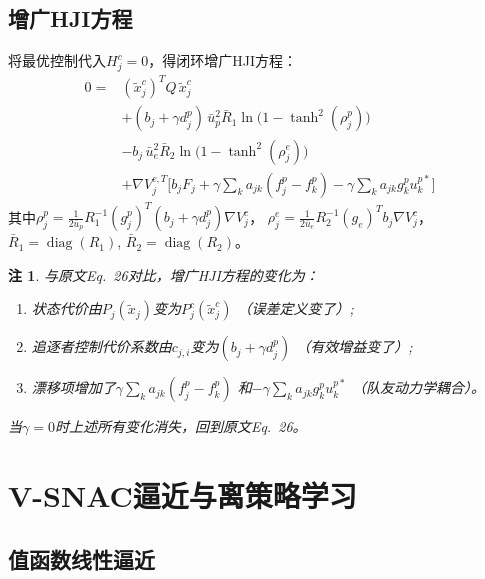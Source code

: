 \documentclass[11pt,a4paper]{article}
\newtheorem{remark}{注}
\DeclareMathOperator{\diag}{diag}
\newcommand{\ub}{\bar{u}}
\begin{document}
\subsection{增广HJI方程}

将最优控制代入$H_j^c = 0$，得闭环增广HJI方程：
\begin{equation}\label{eq:HJI_aug}
  \boxed{
  \begin{aligned}
  0 = {} & (\tilde{x}_j^c)^T Q\, \tilde{x}_j^c \\
  & + (b_j + \gamma d_j^p)\, \ub_p^2 \bar{R}_1
    \ln\!\big(1 - \tanh^2(\rho_j^p)\big) \\
  & - b_j\, \ub_e^2 \bar{R}_2
    \ln\!\big(1 - \tanh^2(\rho_j^e)\big) \\
  & + \nabla V_j^{c,T} \Big[
    b_j F_j + \gamma \textstyle\sum_k a_{jk}(f_j^p - f_k^p)
    - \gamma \textstyle\sum_k a_{jk} g_k^p u_k^{p*}
  \Big]
  \end{aligned}
  }
\end{equation}
其中$\rho_j^p = \frac{1}{2\ub_p} R_1^{-1} (g_j^p)^T (b_j + \gamma d_j^p) \nabla V_j^c$，
$\rho_j^e = \frac{1}{2\ub_e} R_2^{-1} (g_e)^T b_j \nabla V_j^c$，
$\bar{R}_1 = \diag(R_1)$, $\bar{R}_2 = \diag(R_2)$。

\begin{remark}
  与原文Eq.~26对比，增广HJI方程的变化为：
  \begin{enumerate}
    \item 状态代价由$P_j(\tilde{x}_j)$变为$P_j^c(\tilde{x}_j^c)$
          （误差定义变了）;
    \item 追逐者控制代价系数由$c_{j,i}$变为$(b_j + \gamma d_j^p)$
          （有效增益变了）;
    \item 漂移项增加了$\gamma \sum_k a_{jk}(f_j^p - f_k^p)$
          和$-\gamma \sum_k a_{jk} g_k^p u_k^{p*}$
          （队友动力学耦合）。
  \end{enumerate}
  当$\gamma = 0$时上述所有变化消失，回到原文Eq.~26。
\end{remark}


\section{V-SNAC逼近与离策略学习}

\subsection{值函数线性逼近}
\end{document}
